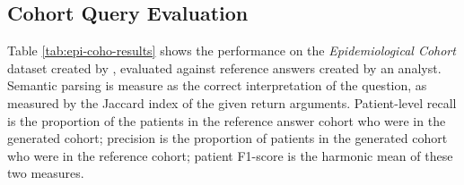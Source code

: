 \documentclass[11pt]{article}
\begin{document}


\subsection{Cohort Query Evaluation}
Table \ref{tab:epi-coho-results} shows the performance on the \textit{Epidemiological Cohort} dataset created by \citet{ziletti_generating_2025}, evaluated against reference answers created by an analyst.
Semantic parsing is measure as the correct interpretation of the question, as measured by the Jaccard index of the given return arguments.
Patient-level recall is the proportion of the patients in the reference answer cohort who were in the generated cohort; precision is the proportion of patients in the generated cohort who were in the reference cohort; patient F1-score is the harmonic mean of these two measures.
\end{document}
